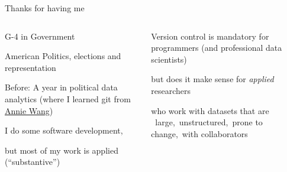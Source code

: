 \documentclass[ignorenonframetext,notes, 10pt, aspectratio=169]{beamer}
\begin{document}
\begin{frame}{Thanks for having me}

\begin{columns}[T]

\begin{column}{0.5\textwidth}
\begin{wideitemize}
\item G-4 in Government
\item American Politics, elections and representation
\item Before: A year in political data analytics (where I learned git from \href{https://anniejw.com/}{Annie Wang})
\end{wideitemize}\pause

\begin{wideitemize}
\item I do some software development, 
\item but most of my work is applied (``substantive'')
\end{wideitemize}
\end{column}\pause
\begin{column}{0.5\textwidth}
\begin{wideitemize}
\item Version control is mandatory for programmers (and professional data scientists)\pause
\item but does it make sense for \emph{applied} researchers
\item who work with datasets that are \pause ~\alert{large},\pause ~\alert{unstructured},\pause ~\alert{prone to change},\pause ~\alert{with collaborators}
\end{wideitemize}
\end{column}
\end{columns}
\end{frame}
\end{document}
